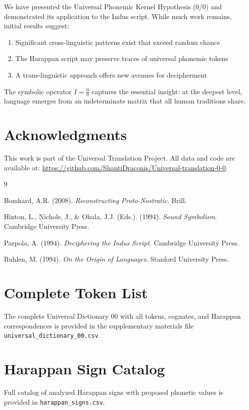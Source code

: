 \documentclass[12pt,a4paper]{article}
\begin{document}
We have presented the Universal Phonemic Kernel Hypothesis (0/0) and demonstrated its application to the Indus script. While much work remains, initial results suggest:

\begin{enumerate}
    \item Significant cross-linguistic patterns exist that exceed random chance
    \item The Harappan script may preserve traces of universal phonemic tokens
    \item A trans-linguistic approach offers new avenues for decipherment
\end{enumerate}

The symbolic operator $I = \frac{0}{0}$ captures the essential insight: at the deepest level, language emerges from an indeterminate matrix that all human traditions share.

\section*{Acknowledgments}

This work is part of the Universal Translation Project. All data and code are available at: \url{https://github.com/ShantiDraconis/Universal-translation-0-0}.


\begin{thebibliography}{9}

Bomhard, A.R. (2008). \textit{Reconstructing Proto-Nostratic}. Brill.

Hinton, L., Nichols, J., \& Ohala, J.J. (Eds.). (1994). \textit{Sound Symbolism}. Cambridge University Press.

Parpola, A. (1994). \textit{Deciphering the Indus Script}. Cambridge University Press.

Ruhlen, M. (1994). \textit{On the Origin of Languages}. Stanford University Press.

\end{thebibliography}

\appendix

\section{Complete Token List}

The complete Universal Dictionary 00 with all tokens, cognates, and Harappan correspondences is provided in the supplementary materials file \texttt{universal\_dictionary\_00.csv}.

\section{Harappan Sign Catalog}

Full catalog of analyzed Harappan signs with proposed phonetic values is provided in \texttt{harappan\_signs.csv}.
\end{document}
